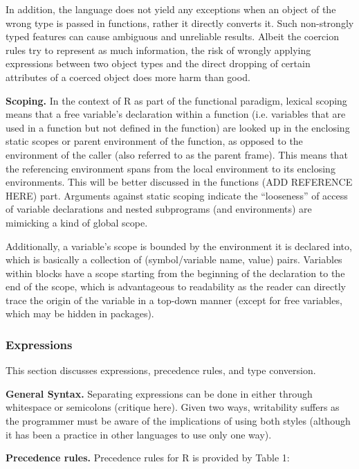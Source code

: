 \documentclass[12pt]{article}
\begin{document}
In addition, the language does not yield any exceptions when an object of the wrong type is passed in functions, rather it directly converts it. Such non-strongly typed features can cause ambiguous and unreliable results. Albeit the coercion rules try to represent as much information, the risk of wrongly applying expressions between two object types and the direct dropping of certain attributes of a coerced object does more harm than good.


\textbf{Scoping.} In the context of R as part of the functional paradigm, lexical scoping means that a free variable's declaration within a function (i.e. variables that are used in a function but not defined in the function) are looked up in the enclosing static scopes or parent environment of the function, as opposed to the environment of the caller (also referred to as the parent frame). This means that the referencing environment spans from the local environment to its enclosing environments. This will be better discussed in the functions (ADD REFERENCE HERE) part. Arguments against static scoping indicate the ``looseness'' of access of variable declarations and nested subprograms (and environments) are mimicking a kind of global scope.

Additionally, a variable's scope is bounded by the environment it is declared into, which is basically a collection of (symbol/variable name, value) pairs. Variables within blocks have a scope starting from the beginning of the declaration to the end of the scope, which is advantageous to readability as the reader can directly trace the origin of the variable in a top-down manner (except for free variables, which may be hidden in packages).

\subsubsection{Expressions}

This section discusses expressions, precedence rules, and type conversion.

\textbf{General Syntax.} Separating expressions can be done in either through whitespace or semicolons (critique here). Given two ways, writability suffers as the programmer must be aware of the implications of using both styles (although it has been a practice in other languages to use only one way).

\textbf{Precedence rules.} Precedence rules for R is provided by Table 1:
\end{document}
